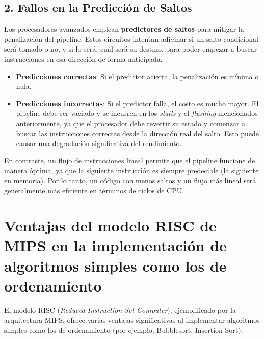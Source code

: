 \documentclass{article}
\begin{document}
\subsection*{2. Fallos en la Predicción de Saltos}
Los procesadores avanzados emplean \textbf{predictores de saltos} para mitigar la penalización del pipeline. Estos circuitos intentan adivinar si un salto condicional será tomado o no, y si lo será, cuál será su destino, para poder empezar a buscar instrucciones en esa dirección de forma anticipada.
\begin{itemize}
    \item \textbf{Predicciones correctas}: Si el predictor acierta, la penalización es mínima o nula.
    \item \textbf{Predicciones incorrectas}: Si el predictor falla, el costo es mucho mayor. El pipeline debe ser vaciado y se incurren en los \textit{stalls} y el \textit{flushing} mencionados anteriormente, ya que el procesador debe revertir su estado y comenzar a buscar las instrucciones correctas desde la dirección real del salto. Esto puede causar una degradación significativa del rendimiento.
\end{itemize}
En contraste, un flujo de instrucciones lineal permite que el pipeline funcione de manera óptima, ya que la siguiente instrucción es siempre predecible (la siguiente en memoria). Por lo tanto, un código con menos saltos y un flujo más lineal será generalmente más eficiente en términos de ciclos de CPU.

\section{Ventajas del modelo RISC de MIPS en la implementación de algoritmos simples como los de ordenamiento}
El modelo RISC (\textit{Reduced Instruction Set Computer}), ejemplificado por la arquitectura MIPS, ofrece varias ventajas significativas al implementar algoritmos simples como los de ordenamiento (por ejemplo, Bubblesort, Insertion Sort):
\end{document}
